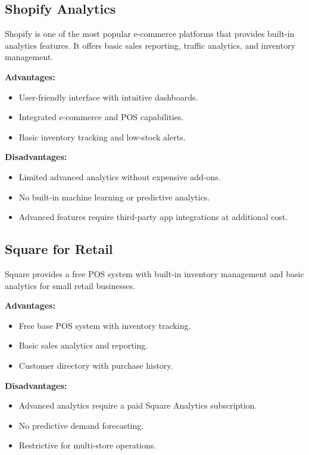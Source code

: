 \documentclass[12pt,a4paper]{report}
\begin{document}
\subsection{Shopify Analytics}
Shopify is one of the most popular e-commerce platforms that provides built-in analytics features. It offers basic sales reporting, traffic analytics, and inventory management.

\textbf{Advantages:}
\begin{itemize}
    \item User-friendly interface with intuitive dashboards.
    \item Integrated e-commerce and POS capabilities.
    \item Basic inventory tracking and low-stock alerts.
\end{itemize}

\textbf{Disadvantages:}
\begin{itemize}
    \item Limited advanced analytics without expensive add-ons.
    \item No built-in machine learning or predictive analytics.
    \item Advanced features require third-party app integrations at additional cost.
\end{itemize}

\subsection{Square for Retail}
Square provides a free POS system with built-in inventory management and basic analytics for small retail businesses.

\textbf{Advantages:}
\begin{itemize}
    \item Free base POS system with inventory tracking.
    \item Basic sales analytics and reporting.
    \item Customer directory with purchase history.
\end{itemize}

\textbf{Disadvantages:}
\begin{itemize}
    \item Advanced analytics require a paid Square Analytics subscription.
    \item No predictive demand forecasting.
    \item Restrictive for multi-store operations.
\end{itemize}
\end{document}
